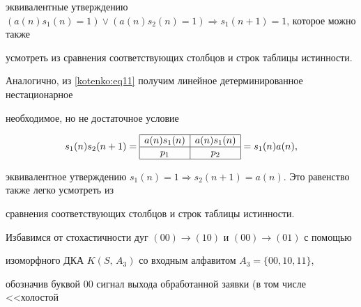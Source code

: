эквивалентные утверждению $ \left( a ( n )s_1  ( n )=1 \right) \vee  \left( a ( n )s_2 ( n )=1 \right)

\Rightarrow s_1 (n+1)=1$, которое можно также

усмотреть из сравнения соответствующих столбцов и строк таблицы истинности.







Аналогично, из \eqref{kotenko:eq11} получим линейное детерминированное нестационарное

необходимое, но не достаточное условие

\[

s_1( n )s_2(n+1)= \begin{array}{|c|c|} \hline

a (n) s_1 ( n )  & a ( n  )s_1 ( n  ) \\ \hline

p_1 & p_2 \\ \hline

\end{array} =s_1  ( n  )a ( n ),

\]

эквивалентное утверждению $s_1 ( n ) = 1 \Rightarrow s_2 (n+1)=a ( n )$. Это равенство также легко усмотреть из

сравнения соответствующих столбцов и строк таблицы истинности.



Избавимся от стохастичности дуг $(00)\to (10)$ и $(00)\to (01)$ с помощью

изоморфного ДКА $K(S,\,A_3)$ со входным алфавитом $A_{3}=\{00,10,11\}$,

обозначив буквой 00 сигнал выхода обработанной заявки (в том числе <<холостой \linebreak



